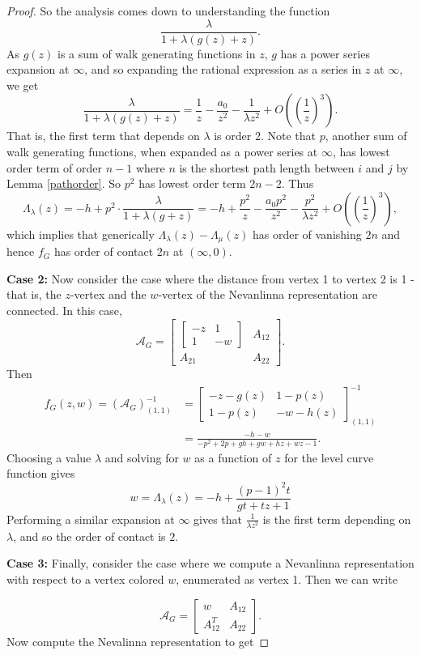 \documentclass[12pt]{amsart}
\theoremstyle{remark}
\newcommand{\A}{\mathcal{A}}
\newcommand{\inv}{^{-1}}
\newcommand\la{\lambda}
\newcommand\bbm{\begin{bmatrix}}
\newcommand\ebm{\end{bmatrix}}
\numberwithin{equation}{section}
\begin{document}
\begin{proof}
So the analysis comes down to understanding the function
\[
\frac{\la}{1 + \la(g(z) + z)}.
\]
As $g(z)$ is a sum of walk generating functions in $z$, $g$ has a power series expansion at $\infty$, and so expanding the rational expression as a series in $z$ at $\infty$, we get
\[
\frac{\la}{1 + \la(g(z) + z)}  = \frac{1}{z}  - \frac{a_0}{z^2} - \frac{1}{\la z^2}  + O\left(\left(\frac{1}{z}\right)^3\right).
\]
That is, the first term that depends on $\la$ is order 2. Note that $p$, another sum of walk generating functions, when expanded as a power series at $\infty$, has  lowest order term of order $n-1$ where $n$ is the shortest path length between $i$ and $j$ by Lemma \ref{pathorder}. So $p^2$ has lowest order term $2n - 2$. Thus 
\[
\Lambda_\la(z) = -h + p^2 \cdot \frac{\la}{1 + \la(g + z)} = -h + \frac{p^2}{z}  - \frac{a_0 p^2 }{z^2} - \frac{p^2}{\la z^2}  + O\left(\left(\frac{1}{z}\right)^3\right),
\]
which implies that generically $\Lambda_\la(z) - \Lambda_\mu(z)$ has order of vanishing $2n$ and hence $f_G$ has order of contact $2n$ at $(\infty, 0)$. 

\textbf{Case 2:} Now consider the case where the distance from vertex 1 to vertex 2 is 1 - that is, the $z$-vertex and the $w$-vertex of the Nevanlinna representation are connected. In this case, 
\[
\A_G = \bbm \bbm -z & 1 \\ 1 & -w \ebm & A_{12} \\ A_{21} & A_{22} \ebm.
\]
Then
\begin{align*}
f_G(z,w) = (\A_G)\inv_{(1,1)} &= \bbm -z -g(z) & 1-p(z) \\ 1-p(z) & -w - h(z) \ebm\inv_{(1,1)} \\
&= \frac{-h-w}{-p^2+2 p+g h+g w+h z+w z-1}.
\end{align*}
Choosing a value $\la$ and solving for $w$ as a function of $z$ for the level curve function gives
\[
w = \Lambda_\la(z) = -h + \frac{(p-1)^2 t}{g t+t z+1}
\]
Performing a similar expansion at $\infty$ gives that $\frac{1}{\la z^2}$ is the first term depending on $\la$, and so the order of contact is $2$.


\textbf{Case 3:} Finally, consider the case where we compute a Nevanlinna representation with respect to a vertex colored $w$, enumerated as vertex 1. Then we can write
    
\[
    \A_G = \begin{bmatrix}
        w & A_{12} \\
        A_{12}^T & A_{22}
    \end{bmatrix}.
\]
Now compute the Nevalinna representation to get


\end{proof}
\end{document}
